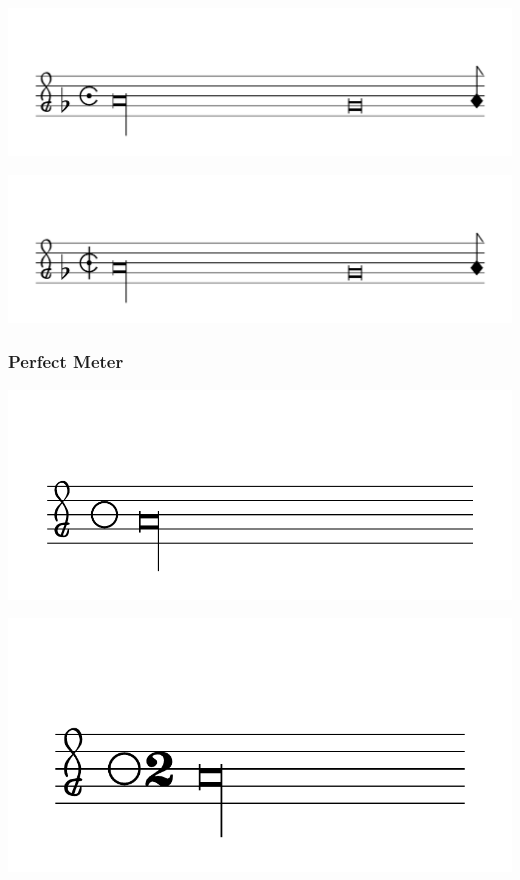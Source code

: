 \documentclass{article}
\begin{document}
        \includegraphics[scale=0.5]{figures_tests/pdf/smens/commonmeter11.pdf}

        \includegraphics[scale=0.5]{figures_tests/pdf/smens/commonmeter12.pdf}

    \subsubsection*{Perfect Meter}
        \includegraphics[scale=0.5]{figures_tests/pdf/smens/perfectmeter1.pdf}

        \includegraphics[scale=0.5]{figures_tests/pdf/smens/perfectmeter2.pdf}
\end{document}
